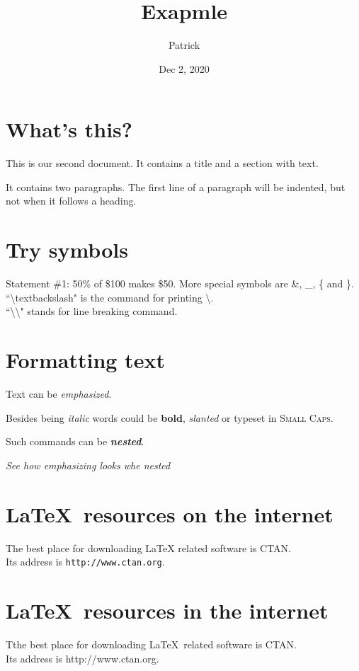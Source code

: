 \documentclass[a4paper, 12pt]{article}
\begin{document}
\title{Exapmle}
\author{Patrick}
\date{Dec 2, 2020}
\maketitle

\section{What's this?}
This is our second document. It contains a title and a section with text.

It contains two paragraphs. The first line of a paragraph will be indented, but not when it follows a heading.

\section{Try symbols}
Statement \#1:
50\% of \$100 makes \$50.
More special symbols are \&, \_, \{ and \}.\\
``\textbackslash textbackslash" is the command for printing \textbackslash.\\
``\textbackslash\textbackslash" stands for line breaking command.

\section{Formatting text}
Text can be \emph{emphasized}.

Besides being \textit{italic} words could be \textbf{bold}, \textsl{slanted} or
  typeset in \textsc{Small Caps}.

Such commands can be \textit{\textbf{nested}}.

\emph{See how \emph{emphasizing} looks whe nested}

\section{\textsf{\LaTeX\ resources on the internet}}
The best place for downloading LaTeX related software is CTAN. \\
Its address is \texttt{http://www.ctan.org}.

\section{\sffamily \LaTeX\ resources in the internet}
Tthe best place for downloading \LaTeX\ related software is CTAN. \\
Its address is \ttfamily http://www.ctan.org\rmfamily.
\end{document}
